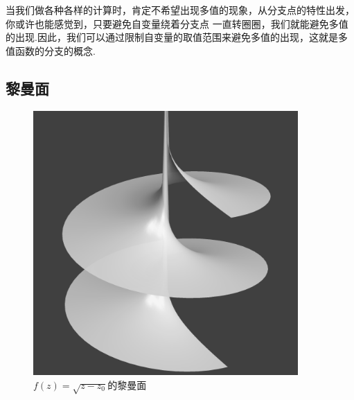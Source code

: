 \documentclass[lang=cn, titlestyle=display, scheme=chinese]{elegantbook}
\begin{document}
                当我们做各种各样的计算时，肯定不希望出现多值的现象，从分支点的特性出发，你或许也能感觉到，只要避免自变量绕着分支点
                一直转圈圈，我们就能避免多值的出现.因此，我们可以通过限制自变量的取值范围来避免多值的出现，这就是多值函数的分支的概念.

            \subsection{黎曼面}
                \begin{figure}[htbp]
                    \centering
                    \begin{minipage}[t]{0.48\textwidth}
                        \centering
                        \includegraphics[width=0.9\textwidth]{RiemannSurface.png}
                        \caption{$f(z) = \sqrt{z - z_0}$的黎曼面}
                        \label{fig:riemann_surface}
                    \end{minipage}
                    \begin{minipage}[t]{0.48\textwidth}
                        \centering

\end{minipage}
\end{figure}
\end{document}
